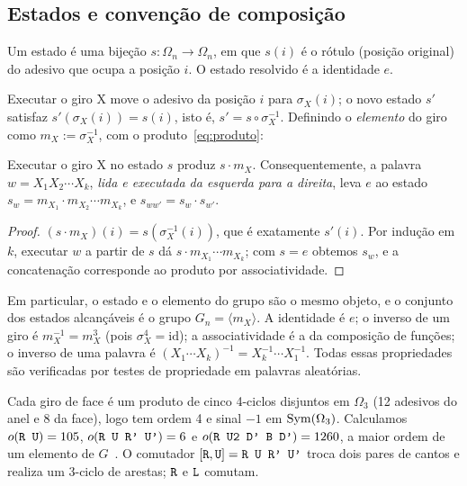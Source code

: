 \subsection{Estados e convenção de composição}
\begin{definition}[Estado]
Um estado é uma bijeção $s:\Omega_n\to\Omega_n$, em que $s(i)$ é o rótulo (posição original) do adesivo que ocupa a posição $i$. O estado resolvido é a identidade $e$.
\end{definition}
Executar o giro X move o adesivo da posição $i$ para $\sigma_X(i)$; o novo estado $s'$ satisfaz $s'(\sigma_X(i))=s(i)$, isto é, $s'=s\circ\sigma_X^{-1}$. Definindo o \emph{elemento} do giro como $m_X:=\sigma_X^{-1}$, com o produto~\eqref{eq:produto}:
\begin{proposition}\label{prop:hom}\proj
Executar o giro X no estado $s$ produz $s\cdot m_X$. Consequentemente, a palavra $w=X_1X_2\cdots X_k$, \emph{lida e executada da esquerda para a direita}, leva $e$ ao estado $s_w=m_{X_1}\cdot m_{X_2}\cdots m_{X_k}$, e $s_{ww'}=s_w\cdot s_{w'}$.
\end{proposition}
\begin{proof}
$(s\cdot m_X)(i)=s(\sigma_X^{-1}(i))$, que é exatamente $s'(i)$. Por indução em $k$, executar $w$ a partir de $s$ dá $s\cdot m_{X_1}\cdots m_{X_k}$; com $s=e$ obtemos $s_w$, e a concatenação corresponde ao produto por associatividade.
\end{proof}
\noindent Em particular, o estado e o elemento do grupo são o mesmo objeto, e o conjunto dos estados alcançáveis é o grupo $G_n=\langle m_X\rangle$. A identidade é $e$; o inverso de um giro é $m_X^{-1}=m_X^3$ (pois $\sigma_X^4=\mathrm{id}$); a associatividade é a da composição de funções; o inverso de uma palavra é $(X_1\cdots X_k)^{-1}=X_k^{-1}\cdots X_1^{-1}$. Todas essas propriedades são verificadas por testes de propriedade em palavras aleatórias.

\begin{example}\label{ex:ordens}\ver
Cada giro de face é um produto de cinco 4-ciclos disjuntos em $\Omega_3$ (12 adesivos do anel e 8 da face), logo tem ordem 4 e sinal $-1$ em $\operatorname{Sym}(\Omega_3)$. Calculamos $o(\texttt{R U})=105$, $o(\texttt{R U R' U'})=6$ e $o(\texttt{R U2 D' B D'})=1260$, a maior ordem de um elemento de $G$~\cite{joyner2008}. O comutador $[\texttt{R},\texttt{U}]=\texttt{R U R' U'}$ troca dois pares de cantos e realiza um 3-ciclo de arestas; $\texttt{R}$ e $\texttt{L}$ comutam.
\end{example}

